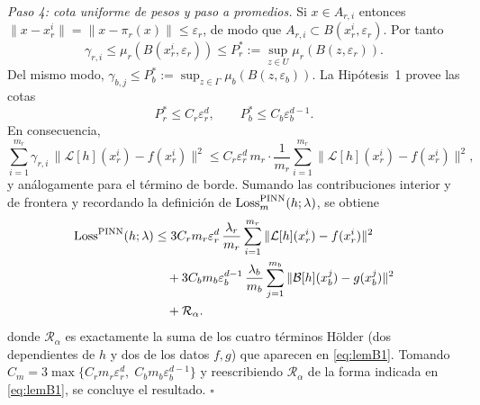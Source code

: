 \smallskip
\noindent\textit{Paso 4: cota uniforme de pesos y paso a promedios.}
Si $x\in A_{r,i}$ entonces $\|x-x_r^i\|=\|x-\pi_r(x)\|\le \varepsilon_r$, de modo que $A_{r,i}\subset B(x_r^i,\varepsilon_r)$. Por tanto
\[
\gamma_{r,i}\le \mu_r(B(x_r^i,\varepsilon_r))\le P_r^*:=\sup_{z\in U}\mu_r(B(z,\varepsilon_r)).
\]
Del mismo modo, $\gamma_{b,j}\le P_b^*:=\sup_{z\in\Gamma}\mu_b(B(z,\varepsilon_b))$.
La Hipótesis~1 provee las cotas
\[
P_r^*\le C_r\varepsilon_r^d,\qquad P_b^*\le C_b\varepsilon_b^{d-1}.
\]
En consecuencia,
\[
\sum_{i=1}^{m_r}\gamma_{r,i}\,\|\mathcal L[h](x_r^i)-f(x_r^i)\|^2
\le C_r\varepsilon_r^d\,m_r\cdot \frac{1}{m_r}\sum_{i=1}^{m_r}\|\mathcal L[h](x_r^i)-f(x_r^i)\|^2,
\]
y análogamente para el término de borde.
Sumando las contribuciones interior y de frontera y recordando la definición de $\text{\rm Loss}^{\text{\rm PINN}}_m(h;\lambda)$, se obtiene
\begin{align*}
\text{\rm Loss}^{\text{\rm PINN}}(h;\lambda)
&\le 3C_r m_r\varepsilon_r^d\,\frac{\lambda_r}{m_r}\sum_{i=1}^{m_r}\|\mathcal L[h](x_r^i)-f(x_r^i)\|^2 \\
&\quad +3C_b m_b\varepsilon_b^{d-1}\,\frac{\lambda_b}{m_b}\sum_{j=1}^{m_b}\|\mathcal B[h](x_b^j)-g(x_b^j)\|^2 \\
&\quad +\mathcal{R}_\alpha.
\end{align*}
donde $\mathcal{R}_\alpha$ es exactamente la suma de los cuatro términos Hölder (dos dependientes de $h$ y dos de los datos $f,g$) que aparecen en \eqref{eq:lemB1}.
Tomando $C_m=3\max\{C_r m_r\varepsilon_r^d,\;C_b m_b\varepsilon_b^{d-1}\}$ y reescribiendo $\mathcal{R}_\alpha$ de la forma indicada en \eqref{eq:lemB1}, se concluye el resultado. \hfill $\square$


